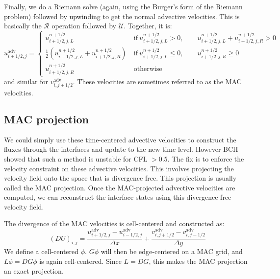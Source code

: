 Finally, we do a Riemann solve (again, using the Burger's form of the
Riemann problem) followed by upwinding to get the normal advective
velocities.  This is basically the $\mathcal{R}$ operation followed 
by $\mathcal{U}$.  Together, it is:
\begin{equation}
u^\mathrm{adv}_{i+1/2,j} = \left \{ \begin{array}{cl}
   u_{i+1/2,j,L}^{n+1/2}  & 
         \mathrm{~if~} u_{i+1/2,j,L}^{n+1/2} > 0, \qquad 
                       u_{i+1/2,j,L}^{n+1/2} + u_{i+1/2,j,R}^{n+1/2} > 0 \\
   \frac{1}{2} \left ( u_{i+1/2,j,L}^{n+1/2} +
                       u_{i+1/2,j,R}^{n+1/2} \right )  &
          \mathrm{~if~} u_{i+1/2,j,L}^{n+1/2} \le 0, \qquad 
                        u_{i+1/2,j,R}^{n+1/2} \ge 0 \\
   u_{i+1/2,j,R}^{n+1/2}  & \mathrm{~otherwise}
  \end{array}
  \right .
\end{equation}
and similar for $v^\mathrm{adv}_{i,j+1/2}$.  
These velocities are sometimes referred to as the MAC velocities.


\subsection{MAC projection}

We could simply use these time-centered advective velocities to
construct the fluxes through the interfaces and update to the new time
level.  However BCH showed that such a method is unstable for CFL $>
0.5$.  The fix is to enforce the velocity constraint on these advective
velocities.  This involves projecting the velocity field onto the
space that is divergence free.  This projection is usually called the
MAC projection.  Once the MAC-projected advective velocities are
computed, we can reconstruct the interface states using this
divergence-free velocity field.

The divergence of the MAC velocities is cell-centered and constructed as:
\begin{equation}
(D U)_{i,j} = \frac{u^\mathrm{adv}_{i+1/2,j} - u^\mathrm{adv}_{i-1/2,j}}
                   {\Delta x} +
              \frac{v^\mathrm{adv}_{i,j+1/2} - v^\mathrm{adv}_{i,j-1/2}}
                   {\Delta y}
\end{equation}
We define a cell-centered $\phi$.  $G\phi$ will then be edge-centered
on a MAC grid, and $L\phi = DG\phi$ is again cell-centered.  Since $L =
DG$, this makes the MAC projection an exact projection.

